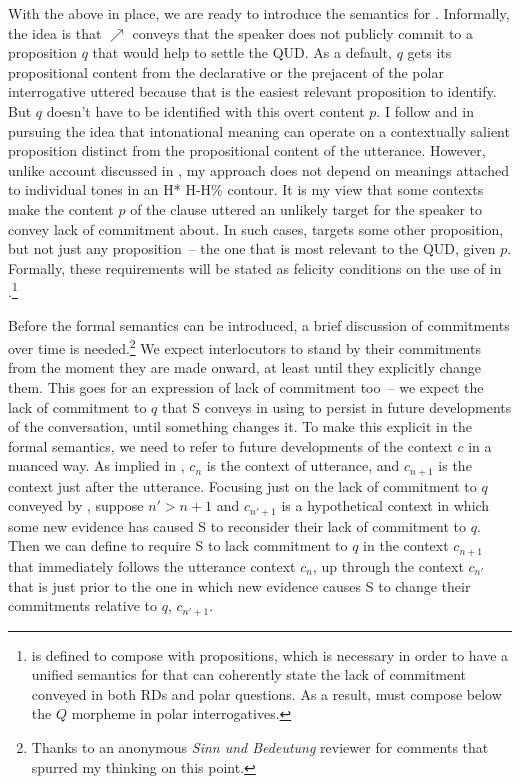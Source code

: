 \documentclass[output=paper,colorlinks,citecolor=brown]{langscibook}
\begin{document}
	With the above in place, we are ready to introduce the semantics for \rise. Informally, the idea is that $\nearrow$ conveys that the speaker does not publicly commit to a proposition $q$ that would help to settle the QUD. As a default, $q$ gets its propositional content from the declarative or the prejacent of the polar interrogative uttered because that is the easiest relevant proposition to identify. But $q$ doesn't have to be identified with this overt content $p$. I follow \citet{bartels99} and \citet{truckenbrodt12} in pursuing the idea that intonational meaning can operate on a contextually salient proposition distinct from the propositional content  of the utterance. However, unlike  account discussed in , my approach does not depend on meanings attached to individual tones in an H* H-H\% contour. It is my view that some contexts make the content $p$ of the clause uttered an unlikely target for the speaker to convey lack of commitment about. In such cases, \rise targets some other proposition, but not just any proposition~-- the one that is most relevant to the QUD, given $p$. Formally, these requirements will be stated as felicity conditions on the use of \rise in .\footnote{\rise is defined to compose with propositions, which is necessary in order to have a unified semantics for \rise that can coherently state the lack of commitment conveyed in both RDs and polar questions. As a result, \rise must compose below the $Q$ morpheme in polar interrogatives.}
	
	Before the formal semantics can be introduced, a brief discussion of commitments over time is needed.\footnote{Thanks to an anonymous \emph{Sinn und Bedeutung} reviewer for comments that spurred my thinking on this point.} We expect interlocutors to stand by their commitments from the moment they are made onward, at least until they explicitly change them. This goes for an expression of lack of commitment too~-- we expect the lack of commitment to $q$ that S conveys in using \rise to persist in future developments of the conversation, until something changes it. To make this explicit in the formal semantics, we need to refer to future developments of the context $c$ in a nuanced way. As implied in , $c_n$ is the context of utterance, and $c_{n+1}$ is the context just after the utterance. Focusing just on the lack of commitment to $q$ conveyed by \rise, suppose $n' > n+1$ and $c_{n'+1}$ is a hypothetical context in which some new evidence has caused S to reconsider their lack of commitment to $q$. Then we can define \rise to require S to lack commitment to $q$ in the context $c_{n+1}$ that immediately follows the utterance context $c_n$, up through the context $c_{n'}$ that is just prior to the one in which new evidence causes S to change their commitments relative to $q$, $c_{n'+1}$.
	
\end{document}
